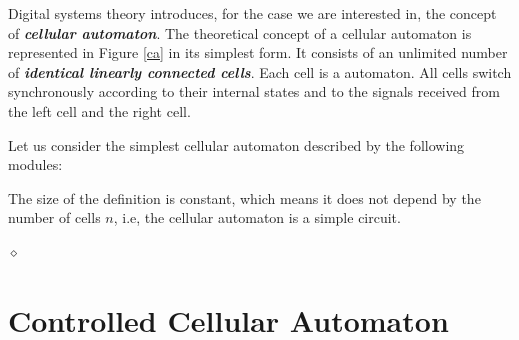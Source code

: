 


Digital systems theory introduces, for the case we are interested in, the concept of {\bf {\em cellular automaton}}.
The theoretical concept of a cellular automaton is represented in Figure \ref{ca} in its simplest form. It consists of an unlimited number of {\bf {\em identical linearly connected cells}}. Each cell is a automaton. All cells switch synchronously according to their internal states and to the signals received from the left cell and the right cell.

\begin{exemplu}\label{lb:cellAut}
Let us consider the simplest cellular automaton described by the following modules:
{\em 
{}
}

{\em 
{}
}

The size of the definition is constant, which means it does not depend by the number of cells $n$, i.e, the cellular automaton is a simple circuit.  

$\diamond$
\end{exemplu}

\section{Controlled Cellular Automaton}\label{contrCellAut}

